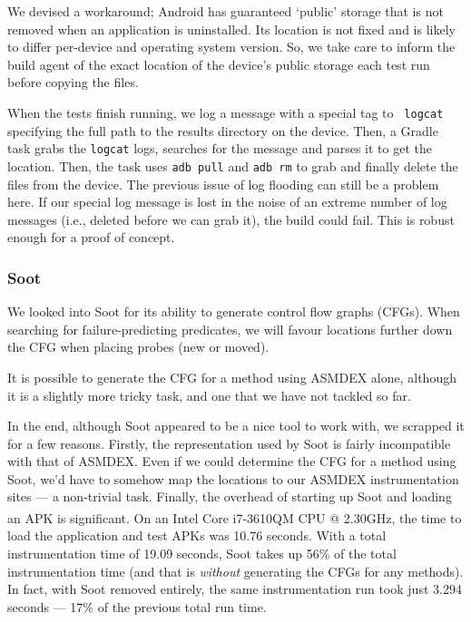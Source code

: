 We devised a workaround; Android has guaranteed {\lq}public{\rq} storage that is
not removed when an application is uninstalled. Its location is not fixed and is
likely to differ per-device and operating system version. So, we take care to
inform the build agent of the exact location of the device's public storage each
test run before copying the files.

When the tests finish running, we log a message with a special tag to {\tt
logcat} specifying the full path to the results directory on the device. Then, a
Gradle task grabs the {\tt logcat} logs, searches for the message and parses it
to get the location. Then, the task uses {\tt adb pull} and {\tt adb rm} to grab
and finally delete the files from the device. The previous issue of log flooding
can still be a problem here. If our special log message is lost in the noise of
an extreme number of log messages (i.e., deleted before we can grab it), the
build could fail. This is robust enough for a proof of concept.

\subsubsection{Soot}

We looked into Soot for its ability to generate control flow graphs (CFGs). When
searching for failure-predicting predicates, we will favour locations further
down the CFG when placing probes (new or moved).

It is possible to generate the CFG for a method using ASMDEX alone, although it
is a slightly more tricky task, and one that we have not tackled so far.

In the end, although Soot appeared to be a nice tool to work with, we scrapped
it for a few reasons. Firstly, the representation used by Soot is fairly
incompatible with that of ASMDEX. Even if we could determine the CFG for a
method using Soot, we'd have to somehow map the locations to our ASMDEX
instrumentation sites --- a non-trivial task. Finally, the overhead of starting
up Soot and loading an APK is significant. On an
Intel\textsuperscript{\textregistered} Core\textsuperscript{\texttrademark}
i7-3610QM CPU @ 2.30GHz, the time to load the application and test APKs was
10.76 seconds. With a total instrumentation time of 19.09 seconds, Soot takes up
56\% of the total instrumentation time (and that is \textit{without} generating
the CFGs for any methods). In fact, with Soot removed entirely, the same
instrumentation run took just 3.294 seconds --- 17\% of the previous total run
time.


